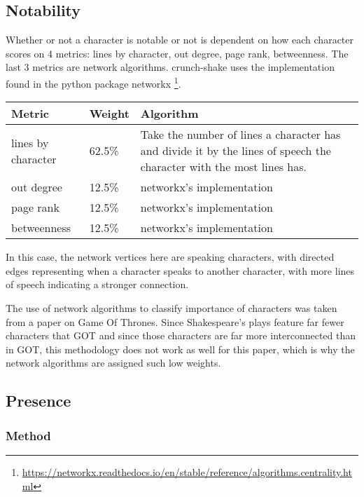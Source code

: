 \documentclass[12pt]{article}
\begin{document}
\subsection{Notability}
\label{sub:notability}

Whether or not a character is notable or not is dependent on how each character
scores on 4 metrics: lines by character, out degree, page rank, betweenness.
The last 3 metrics are network algorithms. crunch-shake uses the
implementation found in the python package networkx
\footnote{\url{https://networkx.readthedocs.io/en/stable/reference/algorithms.centrality.html}}.
\begin{center}
    \begin{tabular}{ | l | l | p{5cm} |}
    \hline
    Metric & Weight & Algorithm \\ \hline
        lines by character & 62.5\% & Take the number of lines a character has
        and divide it by the lines of speech the character with
        the most lines has.\\ \hline
        out degree & 12.5\% & networkx's implementation \\ \hline
        page rank & 12.5\% & networkx's implementation \\ \hline
        betweenness & 12.5\% & networkx's implementation \\
    \hline
    \end{tabular}
\end{center}
In this case, the network vertices here are speaking characters, with directed
edges representing when a character speaks to another character, with more
lines of speech indicating a stronger connection.

The use of network algorithms to classify importance of characters was taken
from a paper on Game Of Thrones. Since Shakespeare's plays feature far fewer
characters that GOT and since those characters are far more interconnected than
in GOT, this methodology does not work as well for this paper, which is why the
network algorithms are assigned such low weights.

\subsection{Presence}
\label{sub:presence}

\subsubsection{Method}
\label{ssub:method}
\end{document}
